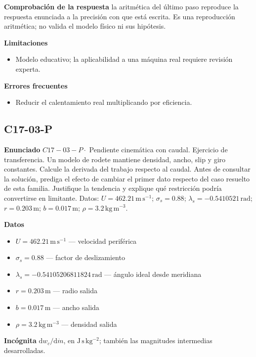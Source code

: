 \documentclass[10pt,openany]{book}
\begin{document}
\noindent\textbf{Comprobación de la respuesta} la aritmética del último paso reproduce la respuesta enunciada a la precisión con que está escrita. Es una reproducción aritmética; no valida el modelo físico ni sus hipótesis.

\noindent\textbf{Limitaciones}
\begin{itemize}
\item Modelo educativo; la aplicabilidad a una máquina real requiere revisión experta.
\end{itemize}

\noindent\textbf{Errores frecuentes}
\begin{itemize}
\item Reducir el calentamiento real multiplicando por eficiencia.
\end{itemize}
\subsection*{C17-03-P}

\noindent\textbf{Enunciado}
\(C17-03-P \cdot\) Pendiente cinemática con caudal. Ejercicio de transferencia. Un modelo de rodete mantiene densidad, ancho, slip y giro constantes. Calcule la derivada del trabajo respecto al caudal. Antes de consultar la solución, prediga el efecto de cambiar el primer dato respecto del caso resuelto de esta familia. Justifique la tendencia y explique qué restricción podría convertirse en limitante. Datos: \(U=462.21\, \mathrm{m}\,\mathrm{s}^{-1}\); \(\sigma_s=0.88\); \(\lambda_s=-0.5410521\, \mathrm{rad}\); \(r=0.203\, \mathrm{m}\); \(b=0.017\, \mathrm{m}\); \(\rho=3.2\, \mathrm{kg}\,\mathrm{m}^{-3}\).

\noindent\textbf{Datos}
\begin{itemize}
\item $U = 462.21\,\mathrm{m}\,\mathrm{s}^{-1}$ — velocidad periférica
\item $\sigma_s = 0.88$ — factor de deslizamiento
\item $\lambda_s = -0.54105206811824\,\mathrm{rad}$ — ángulo ideal desde meridiana
\item $r = 0.203\,\mathrm{m}$ — radio salida
\item $b = 0.017\,\mathrm{m}$ — ancho salida
\item $\rho = 3.2\,\mathrm{kg}\,\mathrm{m}^{-3}$ — densidad salida
\end{itemize}

\noindent\textbf{Incógnita}
$\mathrm{d}w_c/\mathrm{d}\dot{m}$, en $\mathrm{J\,s\,kg^{-2}}$; también las magnitudes intermedias desarrolladas.
\end{document}
